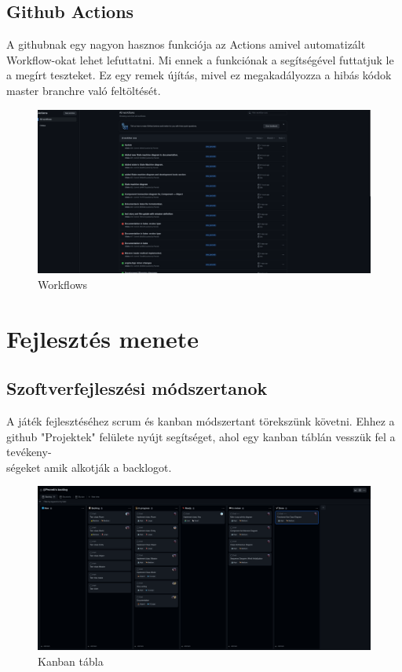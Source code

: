 \documentclass{scrarticle}
\begin{document}
\subsection{Github Actions}
A githubnak egy nagyon hasznos funkciója az Actions amivel automatizált Workflow-okat lehet lefuttatni. Mi ennek a funkciónak a segítségével futtatjuk le a megírt teszteket. Ez egy remek újítás, mivel ez megakadályozza a hibás kódok master branchre való feltöltését.
\begin{figure}[H]
    \includegraphics[width=1.0\columnwidth]{github_actions.png}
    \caption{Workflows}\label{fig:7}
\end{figure}
\newpage

\section{Fejlesztés menete}
\subsection{Szoftverfejleszési módszertanok}
A játék fejlesztéséhez scrum és kanban módszertant törekszünk követni. Ehhez a github "Projektek" felülete nyújt segítséget, ahol egy kanban táblán vesszük fel a tevékeny-\\ségeket amik alkotják a backlogot.
\begin{figure}[H]
    \includegraphics[width=1.0\columnwidth]{kanban_scrum.png}
    \caption{Kanban tábla}\label{fig:8}
\end{figure}
\newpage
\end{document}
